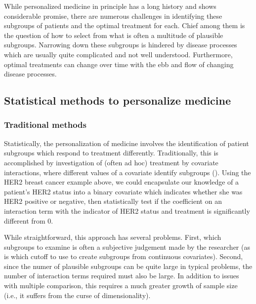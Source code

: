\documentclass[12pt]{article}
\begin{document}
While personalized medicine in principle has a long history and shows considerable promise, there are numerous challenges in identifying these subgroups of patients and the optimal treatment for each. Chief among them is the question of how to select from what is often a multitude of plausible subgroups. Narrowing down these subgroups is hindered by disease processes which are usually quite complicated and not well understood. Furthermore, optimal treatments can change over time with the ebb and flow of changing disease processes.


\subsection{Statistical methods to personalize medicine} %
\label{sub:statistical_methods_to_personalize_medicine}


\subsubsection{Traditional methods} %
\label{ssub:traditional_methods}


Statistically, the personalization of medicine involves the identification of patient subgroups which respond to treatment differently. Traditionally, this is accomplished by investigation of (often ad hoc) treatment by covariate interactions, where different values of a covariate identify subgroups (\cite{Byar1985}). Using the HER2 breast cancer example above, we could encapsulate our knowledge of a patient's HER2 status into a binary covariate which indicates whether she was HER2 positive or negative, then statistically test if the coefficient on an interaction term with the indicator of HER2 status and treatment is significantly different from 0.


While straightforward, this approach has several problems. First, which subgroups to examine is often a subjective judgement made by the researcher (as is which cutoff to use to create subgroups from continuous covariates). Second, since the numer of plausible subgroups can be quite large in typical problems, the number of interaction terms required must also be large. In addition to issues with multiple comparison, this requires a much greater growth of sample size (i.e., it suffers from the curse of dimensionality).
\end{document}
